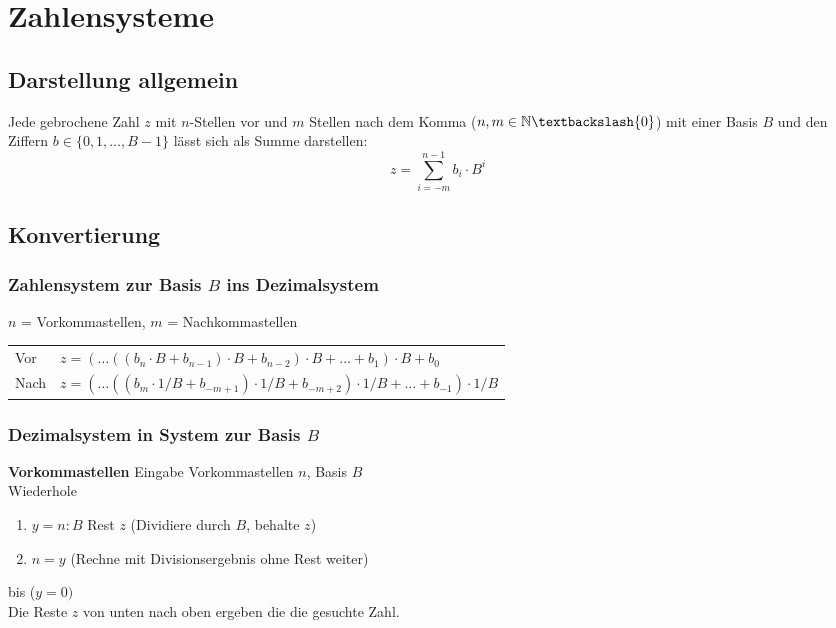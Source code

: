 \section{Zahlensysteme}

\subsection{Darstellung allgemein}
Jede gebrochene Zahl $z$ mit $n$-Stellen vor und $m$ Stellen nach dem Komma ($n, m \in \mathbb{N}\textbackslash\{0\}$) 
mit einer Basis $B$ und den Ziffern $b \in \{0, 1, \dots, B-1\}$ lässt sich als Summe darstellen:
\begin{equation*}
	z = \sum_{i=-m}^{n-1} b_i \cdot B^i
\end{equation*}

\subsection{Konvertierung}
\subsubsection{Zahlensystem zur Basis $B$ ins Dezimalsystem}
$n$ = Vorkommastellen, $m$ = Nachkommastellen
\settowidth{\MyLenA}{Nach~~}
\begin{tabular}{@{}p{\the\MyLenA}%
				@{}p{\linewidth-\the\MyLenA}}
	Vor  & $z = (\dots((b_n \cdot B + b_{n-1}) \cdot B + b_{n-2}) \cdot B + \dots + b_1) \cdot B + b_0$\\
	Nach  & $z = (\dots((b_m \cdot 1/B + b_{-m+1}) \cdot 1/B + b_{-m+2}) \cdot 1/B + \dots + b_{-1}) \cdot 1/B$\\
\end{tabular}

\subsubsection{Dezimalsystem in System zur Basis $B$}

\textbf{Vorkommastellen} Eingabe Vorkommastellen $n$, Basis $B$\\
Wiederhole
\begin{enumerate}
	\item $y = n : B$ Rest $z$ (Dividiere durch $B$, behalte $z$)
	\item $n = y$ (Rechne mit Divisionsergebnis ohne Rest weiter)
\end{enumerate}
bis ($y = 0)$\\
Die Reste $z$ von unten nach oben ergeben die die gesuchte Zahl.

